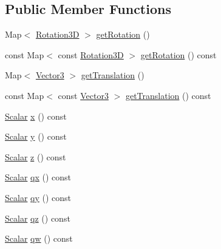 \subsection*{Public Member Functions}
\begin{DoxyCompactItemize}
\item 
Map$<$ \hyperlink{class_displacement_base_aca59ea9e7f5fb3b67a489726bced7f4f}{Rotation3D} $>$ \hyperlink{class_displacement_base_a76ac4502a930ddd52833d2561a13eeb5}{get\+Rotation} ()
\item 
const Map$<$ const \hyperlink{class_displacement_base_aca59ea9e7f5fb3b67a489726bced7f4f}{Rotation3D} $>$ \hyperlink{class_displacement_base_ad13124e677c2749a7d71c5cc53c2e6a1}{get\+Rotation} () const
\item 
Map$<$ \hyperlink{class_displacement_base_a0b5e3b97de6478fd98bf6aec9730d4c4}{Vector3} $>$ \hyperlink{class_displacement_base_a034ba0c1d519c12ceeac9e72d417efb6}{get\+Translation} ()
\item 
const Map$<$ const \hyperlink{class_displacement_base_a0b5e3b97de6478fd98bf6aec9730d4c4}{Vector3} $>$ \hyperlink{class_displacement_base_a1d62cf28e94f43eef14d111c54112913}{get\+Translation} () const
\item 
\hyperlink{class_displacement_base_a978caf313131fd9d221a856a2e4a80ad}{Scalar} \hyperlink{class_displacement_base_ae2b6ce0d58e72f8d36942204303960c1}{x} () const
\item 
\hyperlink{class_displacement_base_a978caf313131fd9d221a856a2e4a80ad}{Scalar} \hyperlink{class_displacement_base_ad23b504e3f85c99bd0a293aef8e823bf}{y} () const
\item 
\hyperlink{class_displacement_base_a978caf313131fd9d221a856a2e4a80ad}{Scalar} \hyperlink{class_displacement_base_ac0d87fc13d3610e764501cd857178a9f}{z} () const
\item 
\hyperlink{class_displacement_base_a978caf313131fd9d221a856a2e4a80ad}{Scalar} \hyperlink{class_displacement_base_ae37c8d2f1d0a6ca84550ab87dec7069d}{qx} () const
\item 
\hyperlink{class_displacement_base_a978caf313131fd9d221a856a2e4a80ad}{Scalar} \hyperlink{class_displacement_base_af0016b6fed409308e531b4945d60b99a}{qy} () const
\item 
\hyperlink{class_displacement_base_a978caf313131fd9d221a856a2e4a80ad}{Scalar} \hyperlink{class_displacement_base_a5fb14d5bda1d8531de6b6b2b05b52d5a}{qz} () const
\item 
\hyperlink{class_displacement_base_a978caf313131fd9d221a856a2e4a80ad}{Scalar} \hyperlink{class_displacement_base_afc5d0180532098927ad33b2ad9b91ec4}{qw} () const

\end{DoxyCompactItemize}

